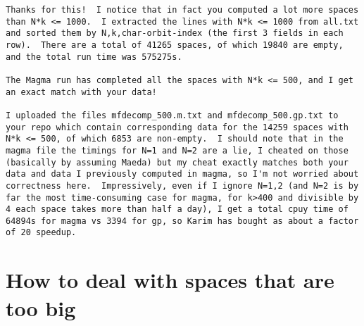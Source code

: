 \documentclass[11pt]{amsart}
\numberwithin{equation}{subsection}
\theoremstyle{definition}
\begin{document}
\begin{verbatim}
Thanks for this!  I notice that in fact you computed a lot more spaces than N*k <= 1000.  I extracted the lines with N*k <= 1000 from all.txt and sorted them by N,k,char-orbit-index (the first 3 fields in each row).  There are a total of 41265 spaces, of which 19840 are empty, and the total run time was 575275s.

The Magma run has completed all the spaces with N*k <= 500, and I get an exact match with your data!

I uploaded the files mfdecomp_500.m.txt and mfdecomp_500.gp.txt to your repo which contain corresponding data for the 14259 spaces with N*k <= 500, of which 6853 are non-empty.  I should note that in the magma file the timings for N=1 and N=2 are a lie, I cheated on those (basically by assuming Maeda) but my cheat exactly matches both your data and data I previously computed in magma, so I'm not worried about correctness here.  Impressively, even if I ignore N=1,2 (and N=2 is by far the most time-consuming case for magma, for k>400 and divisible by 4 each space takes more than half a day), I get a total cpuy time of 64894s for magma vs 3394 for gp, so Karim has bought as about a factor of 20 speedup.
\end{verbatim}

\section{How to deal with spaces that are too big}
\end{document}
